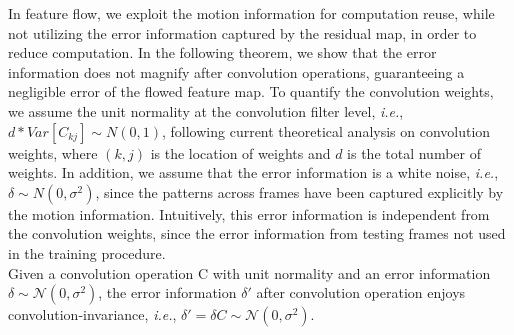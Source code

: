 \documentclass[titlepage]{article}
\begin{document}

In feature flow, we exploit the motion information for computation reuse, while not utilizing the error information captured by the residual map, in order to reduce computation.
In the following theorem, we show that the error information does not magnify after convolution operations, guaranteeing a negligible error of the flowed feature map.
To quantify the convolution weights, we assume the unit normality at the convolution filter level, \textit{i.e.}, $d * Var[C_{kj}] \sim N(0,1)$, following current theoretical analysis \cite{Glorot10understandingthe, He_2015_ICCV} on convolution weights,  where $(k,j)$ is the location of weights and $d$ is the total number of weights.
In addition, we assume that the error information is a white noise, \textit{i.e.}, $\delta \sim N(0, \sigma^2)$, since the patterns across frames have been captured explicitly by the motion information.
Intuitively, this error information is independent from the convolution weights, since the error information from testing frames not used in the training procedure.\\


 Given a convolution operation C with unit normality and an error information $\delta \sim \mathcal{N}(0, \sigma^2)$, the error information $\delta'$ after convolution operation enjoys convolution-invariance, \textit{i.e.}, $\delta' = \delta C \sim \mathcal{N}(0, \sigma^2)$.\\


\end{document}
